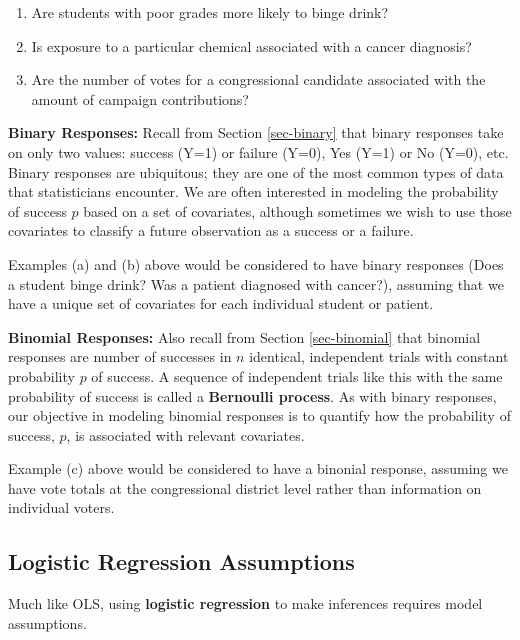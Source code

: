 \documentclass[
]{krantz}
\providecommand{\tightlist}{%
  \setlength{\itemsep}{0pt}\setlength{\parskip}{0pt}}
\begin{document}
\begin{enumerate}
\def\labelenumi{\alph{enumi}.}
\tightlist
\item
  Are students with poor grades more likely to binge drink?
\item
  Is exposure to a particular chemical associated with a cancer diagnosis?
\item
  Are the number of votes for a congressional candidate associated with the amount of campaign contributions?
\end{enumerate}

\textbf{Binary Responses:} Recall from Section \ref{sec-binary} that binary responses take on only two values: success (Y=1) or failure (Y=0), Yes (Y=1) or No (Y=0), etc. Binary responses are ubiquitous; they are one of the most common types of data that statisticians encounter. We are often interested in modeling the probability of success \(p\) based on a set of covariates, although sometimes we wish to use those covariates to classify a future observation as a success or a failure.

Examples (a) and (b) above would be considered to have binary responses (Does a student binge drink? Was a patient diagnosed with cancer?), assuming that we have a unique set of covariates for each individual student or patient.

\textbf{Binomial Responses:} Also recall from Section \ref{sec-binomial} that binomial responses are number of successes in \(n\) identical, independent trials with constant probability \(p\) of success. A sequence of independent trials like this with the same probability of success is called a \textbf{Bernoulli process}.  As with binary responses, our objective in modeling binomial responses is to quantify how the probability of success, \(p\), is associated with relevant covariates.

Example (c) above would be considered to have a binonial response, assuming we have vote totals at the congressional district level rather than information on individual voters.

\hypertarget{logistic-regression-assumptions}{%
\subsection{Logistic Regression Assumptions}\label{logistic-regression-assumptions}}

Much like OLS, using \textbf{logistic regression}  to make inferences requires model assumptions.
\end{document}
